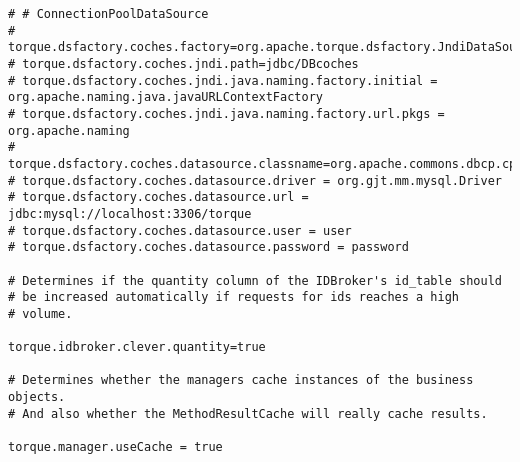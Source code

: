 \begin{lstlisting}
# # ConnectionPoolDataSource
# torque.dsfactory.coches.factory=org.apache.torque.dsfactory.JndiDataSourceFactory
# torque.dsfactory.coches.jndi.path=jdbc/DBcoches
# torque.dsfactory.coches.jndi.java.naming.factory.initial = org.apache.naming.java.javaURLContextFactory
# torque.dsfactory.coches.jndi.java.naming.factory.url.pkgs = org.apache.naming
# torque.dsfactory.coches.datasource.classname=org.apache.commons.dbcp.cpdsadapter.DriverAdapterCPDS
# torque.dsfactory.coches.datasource.driver = org.gjt.mm.mysql.Driver
# torque.dsfactory.coches.datasource.url = jdbc:mysql://localhost:3306/torque
# torque.dsfactory.coches.datasource.user = user
# torque.dsfactory.coches.datasource.password = password

# Determines if the quantity column of the IDBroker's id_table should
# be increased automatically if requests for ids reaches a high
# volume.

torque.idbroker.clever.quantity=true

# Determines whether the managers cache instances of the business objects.
# And also whether the MethodResultCache will really cache results.

torque.manager.useCache = true
\end{lstlisting}